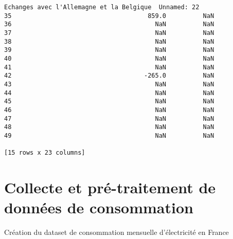 \documentclass[11pt]{article}
\begin{document}
\begin{tcolorbox}[breakable, size=fbox, boxrule=.5pt, pad at break*=1mm, opacityfill=0]
\begin{Verbatim}[commandchars=\\\{\}]
    Echanges avec l'Allemagne et la Belgique  Unnamed: 22
35                                     859.0          NaN
36                                       NaN          NaN
37                                       NaN          NaN
38                                       NaN          NaN
39                                       NaN          NaN
40                                       NaN          NaN
41                                       NaN          NaN
42                                    -265.0          NaN
43                                       NaN          NaN
44                                       NaN          NaN
45                                       NaN          NaN
46                                       NaN          NaN
47                                       NaN          NaN
48                                       NaN          NaN
49                                       NaN          NaN

[15 rows x 23 columns]
\end{Verbatim}
\end{tcolorbox}
        
    \hypertarget{collecte-et-pruxe9-traitement-de-donnuxe9es-de-consommation}{%
\section{Collecte et pré-traitement de données de
consommation}\label{collecte-et-pruxe9-traitement-de-donnuxe9es-de-consommation}}

Création du dataset de consommation mensuelle d'électricité en France
\end{document}
